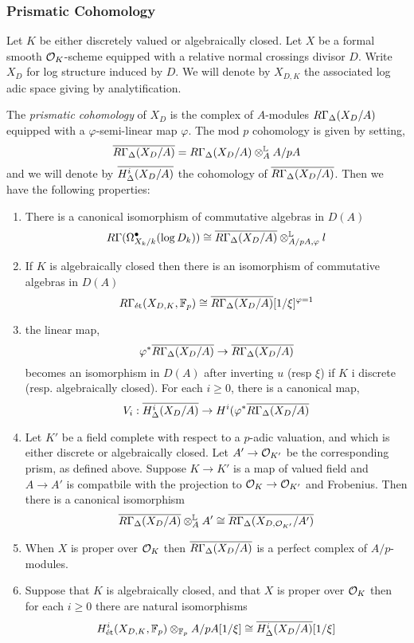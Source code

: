 \documentclass[12pt]{article}
\begin{document}
\subsubsection{Prismatic Cohomology}

Let $K$ be either discretely valued or algebraically closed. Let $X$ be a formal smooth $\mathcal{O}_K$-scheme equipped with a relative normal crossings divisor $D$. Write $X_D$ for log structure induced by $D$. We will denote by $X_{D,K}$ the associated log adic space giving by analytification. 
\par 
The \textit{prismatic cohomology} of $X_D$ is the complex of $A$-modules $R \Gamma_{\Delta}(X_D/A)$ equipped with a $\varphi$-semi-linear map $\varphi$. The mod $p$ cohomology is given by setting,
\[ \overline{R \Gamma_{\Delta}(X_D/A)} = R \Gamma_{\Delta}(X_D/A) \otimes_A^{\mathbb{L}} A / p A \]
and we will denote by $\overline{H^i_{\Delta}(X_D/A)}$ the cohomology of $\overline{R \Gamma_{\Delta}(X_D/A)}$. Then we have the following properties:
\begin{enumerate}
\item There is a canonical isomorphism of commutative algebras in $D(A)$
\[ R \Gamma(\Omega^\bullet_{X_k/k}(\log{D_k})) \cong \overline{R \Gamma_{\Delta}(X_D/A)} \otimes^{\mathbb{L}}_{A/pA, \varphi} l \]
\item If $K$ is algebraically closed then there is an isomorphism of commutative algebras in $D(A)$
\[ R \Gamma_{\text{\'{e}t}}(X_{D,K}, \mathbb{F}_p) \cong \overline{R \Gamma_{\Delta}(X_D/A)}[1/\xi]^{\varphi=1} \]
\item the linear map,
\[ \varphi^* \overline{R \Gamma_{\Delta}(X_D/A)} \to \overline{R \Gamma_{\Delta}(X_D/A)} \]
becomes an isomorphism in $D(A)$ after inverting $u$ (resp $\xi$) if $K$ i discrete (resp. algebraically closed). For each $i \ge 0$, there is a canonical map,
\[ V_i : \overline{H^i_{\Delta}(X_D/A)} \to H^i(\varphi^* \overline{R \Gamma_{\Delta}(X_D/A)} \]
\item Let $K'$ be a field complete with respect to a $p$-adic valuation, and which is either discrete or algebraically closed. Let $A' \to \mathcal{O}_{K'}$ be the corresponding prism, as defined above. Suppose $K \to K'$ is a map of valued field and $A \to A'$ is compatbile with the projection to $\mathcal{O}_K \to \mathcal{O}_{K'}$ and Frobenius. Then there is a canonical isomorphism
\[ \overline{R \Gamma_{\Delta}(X_D/A)} \otimes_A^{\mathbb{L}} A' \cong \overline{R \Gamma_{\Delta}(X_{D, \mathcal{O}_{K'}}/A')} \]
\item When $X$ is proper over $\mathcal{O}_K$ then $\overline{R \Gamma_{\Delta}(X_D/A)}$ is a perfect complex of $A/p$-modules.
\item Suppose that $K$ is algebraically closed, and that $X$ is proper over $\mathcal{O}_K$ then for each $i \ge 0$ there are natural isomorphisms
\[ H^i_{\text{\'{e}t}}(X_{D,K}, \mathbb{F}_p) \otimes_{\mathbb{F}_p} A / p A[1/\xi] \cong \overline{H^i_{\Delta}(X_D/A)}[1/\xi] \]
\end{enumerate}
\end{document}
